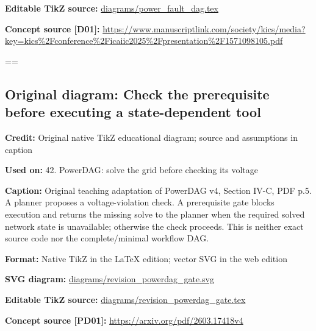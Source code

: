 \documentclass[10pt,letterpaper]{article}
\begin{document}
\textbf{Editable TikZ source:} \href{diagrams/power_fault_dag.tex}{\small\ttfamily diagrams/\allowbreak{}power\_\allowbreak{}fault\_\allowbreak{}dag.\allowbreak{}tex}\par
\textbf{Concept source [D01]:} \href{https://www.manuscriptlink.com/society/kics/media?key=kics\%2Fconference\%2Ficaiic2025\%2Fpresentation\%2F1571098105.pdf}{\small\ttfamily https:/\allowbreak{}/\allowbreak{}www.\allowbreak{}manuscriptlink.\allowbreak{}com/\allowbreak{}society/\allowbreak{}kics/\allowbreak{}media?\allowbreak{}key=\allowbreak{}kics\%\allowbreak{}2Fconference\%\allowbreak{}2Ficaiic2025\%\allowbreak{}2Fpresentation\%\allowbreak{}2F1571098105.\allowbreak{}pdf}\par
\egroup\par\noindent\box\readingEntry\par\medskip
\setbox\readingEntry=\vbox\bgroup\hsize=\linewidth\subsection*{Original diagram: Check the prerequisite before executing a state-dependent tool}
\textbf{Credit:} Original native TikZ educational diagram; source and assumptions in caption\par
\textbf{Used on:} 42. PowerDAG: solve the grid before checking its voltage\par
\textbf{Caption:} Original teaching adaptation of PowerDAG v4, Section IV-C, PDF p.5. A planner proposes a voltage-violation check. A prerequisite gate blocks execution and returns the missing solve to the planner when the required solved network state is unavailable; otherwise the check proceeds. This is neither exact source code nor the complete/minimal workflow DAG.\par
\textbf{Format:} Native TikZ in the LaTeX edition; vector SVG in the web edition\par
\textbf{SVG diagram:} \href{diagrams/revision_powerdag_gate.svg}{\small\ttfamily diagrams/\allowbreak{}revision\_\allowbreak{}powerdag\_\allowbreak{}gate.\allowbreak{}svg}\par
\textbf{Editable TikZ source:} \href{diagrams/revision_powerdag_gate.tex}{\small\ttfamily diagrams/\allowbreak{}revision\_\allowbreak{}powerdag\_\allowbreak{}gate.\allowbreak{}tex}\par
\textbf{Concept source [PD01]:} \href{https://arxiv.org/pdf/2603.17418v4}{\small\ttfamily https:/\allowbreak{}/\allowbreak{}arxiv.\allowbreak{}org/\allowbreak{}pdf/\allowbreak{}2603.\allowbreak{}17418v4}\par
\end{document}
